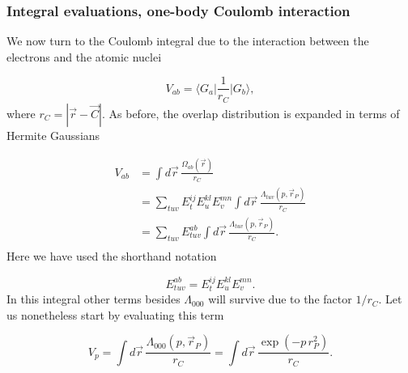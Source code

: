 \documentclass{beamer}
\begin{document}
\begin{frame}
\frametitle{Integral evaluations, one-body Coulomb interaction}

\begin{block}{}

We now turn to the Coulomb integral due to the interaction between the electrons and the atomic nuclei

\begin{equation}
 V_{ab} = \langle G_a\vert\frac{1}{r_C}\vert G_b\rangle,
\end{equation}
where $r_C = |\vec r - \vec C|$. As before, the overlap distribution is expanded in terms of  Hermite Gaussians

\begin{equation}
\begin{split}
 V_{ab} & = \int d\vec r \,\frac{\Omega_{ab}(\vec r)}{r_C} \\
        & = \sum_{tuv}E^{ij}_t E^{kl}_u E^{mn}_v\int d\vec r \, \frac{\Lambda_{tuv}(p,\vec r_P)}{r_C} \\
        & = \sum_{tuv}E^{ab}_{tuv}\int d\vec r \, \frac{\Lambda_{tuv}(p,\vec r_P)}{r_C}. \\
\end{split}
\end{equation}
Here we have used the shorthand notation

\begin{equation}
 E^{ab}_{tuv} = E^{ij}_t E^{kl}_u E^{mn}_v.
\end{equation}
In this integral other terms besides $\Lambda_{000}$ will survive due to the factor $1/r_C$. Let us nonetheless start by evaluating this term

\begin{equation}
 V_p = \int d\vec r \, \frac{\Lambda_{000}(p,\vec r_P)}{r_C} = \int d\vec r\, \frac{\exp(-p\,r_P^2)}{r_C}.
\end{equation}
\end{block}
\end{frame}
\end{document}
